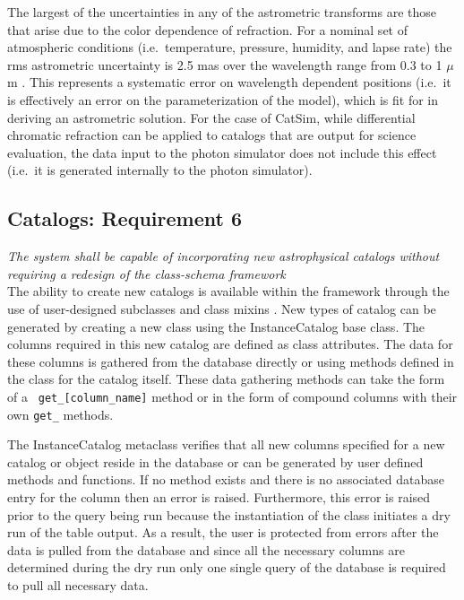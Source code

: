 \documentclass[]{article}
\begin{document}
The largest of the uncertainties in any of the astrometric transforms
are those that arise due to the color dependence of refraction. For a
nominal set of atmospheric conditions (i.e.\ temperature, pressure,
humidity, and lapse rate) the rms astrometric uncertainty is 2.5 mas
over the wavelength range from 0.3 to 1 $\mu$m . This represents a
systematic error on wavelength dependent positions (i.e.\ it is
effectively an error on the parameterization of the model), which is
fit for in deriving an astrometric solution. For the case of CatSim,
while differential chromatic refraction can be applied to catalogs
that are output for science evaluation, the data input to the photon
simulator does not include this effect (i.e.\ it is generated
internally to the photon simulator).

\subsection{Catalogs: Requirement 6}

{\it The system shall be capable of incorporating new astrophysical catalogs without requiring
a redesign of the class-schema framework}\\

The ability to create new catalogs is available within the framework
through the use of user-designed subclasses and class mixins \citep{mixin}.
New types of catalog can be generated by creating a new class using
the InstanceCatalog base class. The columns required in this new catalog are defined
as class attributes. The data for these columns is gathered from the
database directly or using methods defined in the class for the
catalog itself. These data gathering methods can take the form of a {\tt
  get\_[column\_name]} method or in the form of compound columns with
their own {\tt get\_} methods. 

The InstanceCatalog metaclass verifies that all new columns specified
for a new catalog or object reside in the database or can be generated
by user defined methods and functions.  If no method exists and there
is no associated database entry for the column then an error is
raised. Furthermore, this error is raised prior to the query being run
because the instantiation of the class initiates a dry run of the
table output. As a result, the user is protected from errors after the
data is pulled from the database and since all the necessary columns
are determined during the dry run only one single query of the
database is required to pull all necessary data.
\end{document}
